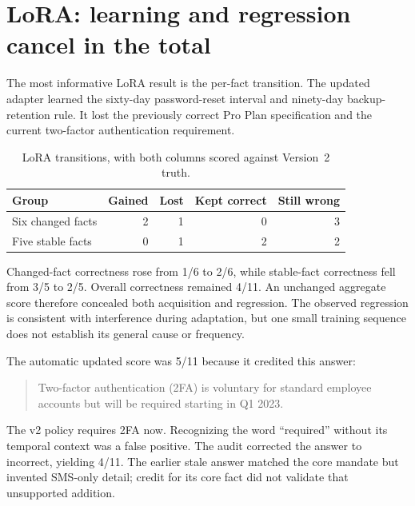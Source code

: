 \documentclass[11pt,letterpaper,oneside]{report}
\begin{document}
\section{LoRA: learning and regression cancel in the total}
The most informative LoRA result is the per-fact transition. The updated adapter learned the sixty-day password-reset interval and ninety-day backup-retention rule. It lost the previously correct Pro Plan specification and the current two-factor authentication requirement.
\begin{table}[H]\centering\small
\caption{LoRA transitions, with both columns scored against Version~2 truth.}\label{tab:transitions}
\begin{tabularx}{\linewidth}{Lrrrr}\toprule
Group & Gained & Lost & Kept correct & Still wrong\\\midrule
Six changed facts & 2 & 1 & 0 & 3\\
Five stable facts & 0 & 1 & 2 & 2\\\bottomrule
\end{tabularx}
\end{table}
Changed-fact correctness rose from 1/6 to 2/6, while stable-fact correctness fell from 3/5 to 2/5. Overall correctness remained 4/11. An unchanged aggregate score therefore concealed both acquisition and regression. The observed regression is consistent with interference during adaptation, but one small training sequence does not establish its general cause or frequency.

The automatic updated score was 5/11 because it credited this answer:
\begin{quote}\small
Two-factor authentication (2FA) is voluntary for standard employee accounts but will be required starting in Q1 2023.
\end{quote}
The v2 policy requires 2FA now. Recognizing the word ``required'' without its temporal context was a false positive. The audit corrected the answer to incorrect, yielding 4/11. The earlier stale answer matched the core mandate but invented SMS-only detail; credit for its core fact did not validate that unsupported addition.
\end{document}
